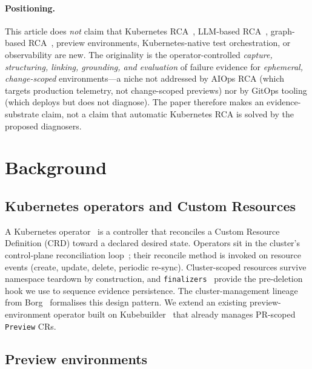 \documentclass[sigconf, nonacm=true, anonymous=false, review=false]{acmart}
\begin{document}
\paragraph{Positioning.} This article does \emph{not} claim that
Kubernetes RCA~\cite{zhang_microservice_diagnosis_survey_2025}, LLM-based
RCA~\cite{openrca_2025, rcacopilot_2024}, graph-based
RCA~\cite{microrca_2020, microdiag_2021, causalrca_2023}, preview
environments, Kubernetes-native test orchestration, or observability are
new. The originality is the operator-controlled \emph{capture,
structuring, linking, grounding, and evaluation} of failure evidence for
\emph{ephemeral, change-scoped} environments---a niche not addressed by
AIOps RCA (which targets production telemetry, not change-scoped
previews) nor by GitOps tooling (which deploys but does not diagnose).
The paper therefore makes an evidence-substrate claim, not a claim that
automatic Kubernetes RCA is solved by the proposed diagnosers.

\section{Background}
\label{sec:bg}

\subsection{Kubernetes operators and Custom Resources}
\label{sec:bg-operators}

A Kubernetes operator~\cite{kubernetes_operator_pattern,
kubernetes_custom_resources} is a controller that reconciles a Custom
Resource Definition (CRD) toward a declared desired state. Operators
sit in the cluster's control-plane reconciliation
loop~\cite{kubernetes_controller_concepts}; their reconcile method is
invoked on resource events (create, update, delete, periodic
re-sync). Cluster-scoped resources survive namespace teardown by
construction, and \texttt{finalizers}~\cite{kubernetes_finalizers}
provide the pre-deletion hook we use to sequence evidence
persistence. The cluster-management lineage from
Borg~\cite{borg_2015} formalises this design pattern. We extend an
existing preview-environment operator built on
Kubebuilder~\cite{kubebuilder_sigs} that already manages PR-scoped
\texttt{Preview} CRs.

\subsection{Preview environments}
\label{sec:bg-preview}
\end{document}
